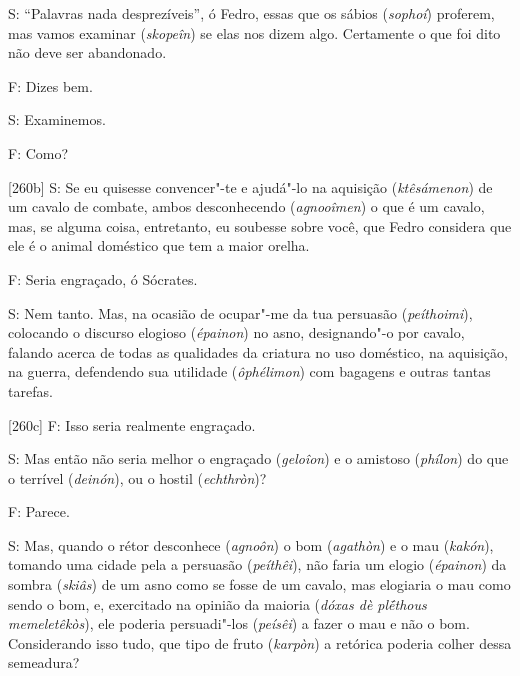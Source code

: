  

S: ``Palavras nada desprezíveis'', ó Fedro, essas que os sábios
(\emph{sophoí}) proferem, mas vamos examinar (\emph{skopeîn}) se elas
nos dizem algo. Certamente o que foi dito não deve ser abandonado.

 

F: Dizes bem.

 

S: Examinemos.

 

F: Como?

 

[260b] S: Se eu quisesse convencer"-te e ajudá"-lo na aquisição
(\emph{ktêsámenon}) de um cavalo de combate, ambos desconhecendo
(\emph{agnooîmen}) o que é um cavalo, mas, se alguma coisa, entretanto,
eu soubesse sobre você, que Fedro considera que ele é o animal doméstico
que tem a maior orelha.

 

F: Seria engraçado, ó Sócrates.

 

S: Nem tanto. Mas, na ocasião de ocupar"-me da tua persuasão
(\emph{peíthoimi}), colocando o discurso elogioso (\emph{épainon}) no
asno, designando"-o por cavalo, falando acerca de todas as qualidades da
criatura no uso doméstico, na aquisição, na guerra, defendendo sua
utilidade (\emph{ôphélimon}) com bagagens e outras tantas tarefas.

 

[260c] F: Isso seria realmente engraçado.

 

S: Mas então não seria melhor o engraçado (\emph{geloîon}) e o amistoso
(\emph{phílon}) do que o terrível (\emph{deinón}), ou o hostil
(\emph{echthròn})?

 

F: Parece.

 

S: Mas, quando o rétor desconhece (\emph{agnoôn}) o bom (\emph{agathòn})
e o mau (\emph{kakón}), tomando uma cidade pela a persuasão
(\emph{peíthêi}), não faria um elogio (\emph{épainon}) da sombra
(\emph{skiâs}) de um asno como se fosse de um cavalo, mas elogiaria o
mau como sendo o bom, e, exercitado na opinião da maioria (\emph{dóxas
dè plḗthous memeletêkòs}), ele poderia persuadi"-los (\emph{peísêi}) a
fazer o mau e não o bom. Considerando isso tudo, que tipo de fruto
(\emph{karpòn}) a retórica poderia colher dessa semeadura?

 

